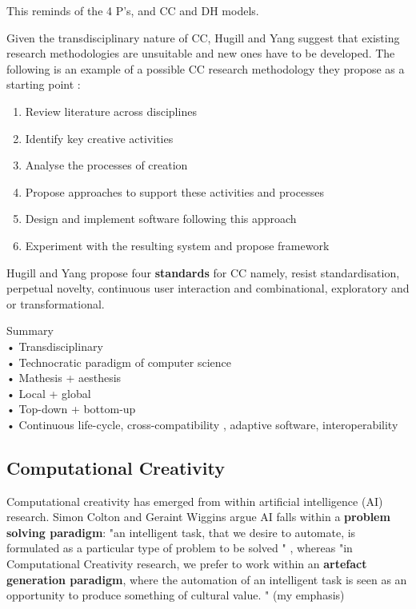 \begin{draft}
This reminds of the 4 P’s, and CC and DH models.
\end{draft}

Given the transdisciplinary nature of CC, Hugill and Yang suggest that existing research methodologies are unsuitable and new ones have to be developed. The following is an example of a possible CC research methodology they propose as a starting point \citep[p.17]{Hugill2013c}:

\begin{enumerate}
\item Review literature across disciplines
\item Identify key creative activities
\item Analyse the processes of creation
\item Propose approaches to support these activities and processes
\item Design and implement software following this approach
\item Experiment with the resulting system and propose framework
\end{enumerate}

Hugill and Yang propose four \textbf{standards} for CC \citep[p.17]{Hugill2013c} namely, resist standardisation, perpetual novelty, continuous user interaction and combinational, exploratory and or transformational.

\begin{shaded}
Summary\\
•	Transdisciplinary\\
•	Technocratic paradigm of computer science\\
•	Mathesis + aesthesis\\
•	Local + global\\
•	Top-down + bottom-up\\
•	Continuous life-cycle, cross-compatibility , adaptive software, interoperability
\end{shaded}

\subsection{Computational Creativity}

Computational creativity has emerged from within artificial intelligence (AI) research. Simon Colton and Geraint Wiggins argue AI falls within a \textbf{problem solving paradigm}: "an intelligent task, that we desire to automate, is formulated as a particular type of problem to be solved " \citep[p.2]{Colton2012},  whereas "in Computational Creativity research, we prefer to work within an \textbf{artefact generation paradigm}, where the automation of an intelligent task is seen as an opportunity to produce something of cultural value. " \citep[p.2]{Colton2012}(my emphasis)


